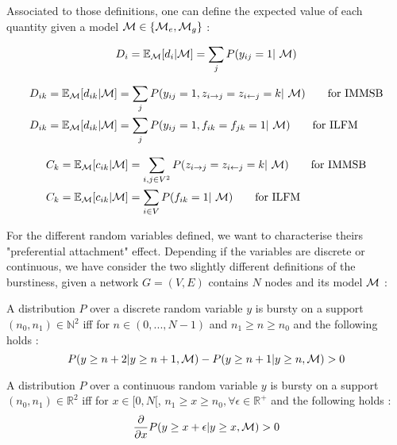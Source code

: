 Associated to those definitions, one can define the expected value of each quantity given a model $\mathcal{M} \in \{\mathcal{M}_e, \mathcal{M}_g\}$ :

\begin{lemma}
    \begin{equation}
        D_i = \E_\M[d_i | \M] = \sum_j \p(y_{ij}=1 | \M)
    \end{equation}
\end{lemma}

\begin{lemma}
    \begin{align}
        D_{ik} &= \E_\M[d_{ik} | \M] = \sum_j \p(y_{ij}=1, z_{i\rightarrow j}=z_{i\leftarrow j}=k | \M) \qquad \textrm{for IMMSB} \\
        D_{ik} &= \E_\M[d_{ik} | \M] = \sum_j \p(y_{ij}=1, f_{ik}=f_{jk}=1 | \M) \qquad \textrm{for ILFM}
    \end{align}
\end{lemma}

\begin{lemma}
    \begin{align}
        C_k &= \E_\M[c_{ik} | \M] = \sum_{i,j \in V^2} \p(z_{i\rightarrow j}=z_{i\leftarrow j}=k | \M) \qquad \textrm{for IMMSB} \\
        C_k &= \E_\M[c_{ik} | \M] = \sum_{i \in V} \p(f_{ik}=1 | \M) \qquad \textrm{for ILFM}
    \end{align}
\end{lemma}

For the different random variables defined, we want to characterise theirs "preferential attachment" effect. Depending if the variables are discrete or continuous, we have consider the two slightly different definitions of the burstiness, given a network $G=(V,E)$ contains $N$ nodes and its model $\mathcal{M}$  :

\begin{definition} \label{discrete_burstiness}
    A distribution $P$ over a discrete random variable $y$ is bursty on a support $(n_0, n_1) \in \mathbb{N}^2$ iff for $n \in (0,..., N-1)$ and $n_1 \geq  n \geq n_0$ and the following holds : 
    \begin{equation}
        P(y \geq n+2 | y \geq n+1, \mathcal{M}) - P(y \geq n+1 | y \geq n, \mathcal{M}) > 0
    \end{equation}
\end{definition}

\begin{definition} \label{continious_burstiness}
    A  distribution $P$ over a continuous random variable $y$ is bursty on a support $(n_0, n_1) \in \mathbb{R}^2$ iff for $x \in [0, N[$,  $n_1 \geq x \geq n_0, \forall \epsilon \in \mathbb{R^+}$ and the following holds : 
    \begin{equation}
        \frac{\partial}{\partial x}P(y \geq x+\epsilon | y \geq x, \mathcal{M}) > 0
    \end{equation}
\end{definition}


